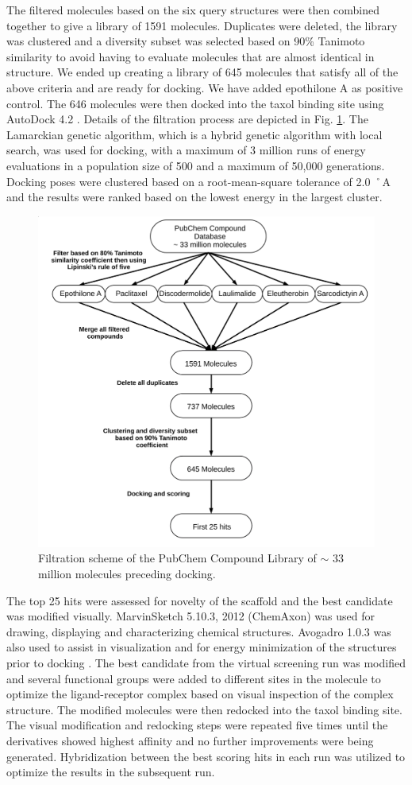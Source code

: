 \documentclass[11pt]{report}
\begin{document}
The filtered molecules based on the six query structures were then combined together to give a library of 1591 molecules. Duplicates were deleted, the library was clustered and a diversity subset was selected based on
90\%
Tanimoto similarity to avoid having to evaluate molecules that are almost identical in structure. We ended up creating a library of 645 molecules that satisfy all of the above criteria and are ready for docking. We have added epothilone A as positive control. The 646 molecules were then docked into the taxol binding site using AutoDock 4.2
\cite{Morris2009}. Details of the filtration process are depicted in Fig.
\ref{f:VS-flowchart}. The Lamarckian genetic algorithm, which is a hybrid genetic algorithm with local search, was used for docking, with a maximum of 3 million runs of energy evaluations in a population size of 500 and a maximum of 50,000 generations. Docking poses were clustered based on a root-mean-square tolerance of 2.0 ˚A and the results were ranked based on the lowest energy in the largest cluster.
\begin{figure}
  \centering
  \includegraphics[width=0.6\linewidth]{images/Flowchart}
  \caption[Filtration scheme]{Filtration scheme of the PubChem Compound Library of $\sim$ 33 million molecules preceding docking.}
  \label{f:VS-flowchart}
\end{figure}

The top 25 hits were assessed for novelty of the scaffold and the
best candidate was modified visually. MarvinSketch 5.10.3, 2012 (ChemAxon) was used for drawing, displaying and characterizing chemical structures. Avogadro 1.0.3 was also used to assist in visualization and for energy minimization of the structures prior to docking
\cite{Hanwell2012}.
The best candidate from the virtual screening run was modified and several functional groups were added to different sites in the molecule to optimize the ligand-receptor complex based on visual inspection of the complex structure. The modified
molecules were then redocked into the taxol binding site. The visual modification and redocking steps were repeated five times until the derivatives showed highest affinity and no further improvements were being generated. Hybridization between the best scoring hits in each run was utilized to optimize the results in the subsequent run.
\end{document}
